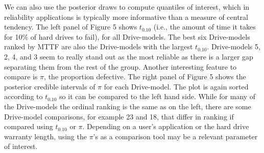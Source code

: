 \documentclass[12pt]{article}
\begin{document}
We can also use the posterior draws to compute quantiles of interest, which in reliability applications is typically more informative than a measure of central tendency.  The left panel of Figure 5 shows $t_{0.10}$ (i.e., the amount of time it takes for 10\% of hard drives to fail), for all Drive-models. The best six Drive-models ranked by MTTF are also the Drive-models with the largest $t_{0.10}$.  Drive-models 5, 2, 4, and 3 seem to really stand out as the most reliable as there is a larger gap separating them from the rest of the group.  Another interesting feature to compare is $\pi$, the proportion defective.  The right panel of Figure 5 shows the posterior credible intervals of $\pi$ for each Drive-model.  The plot is again sorted according to $t_{0.10}$ so it can be compared to the left hand side.  While for many of the Drive-models the ordinal ranking is the same as on the left, there are some Drive-model comparisons, for example 23 and 18, that differ in ranking if compared using $t_{0.10}$ or $\pi$.  Depending on a user's application or the hard drive warranty length, using the $\pi$'s as a comparison tool may be a relevant parameter of interest.  
\end{document}
